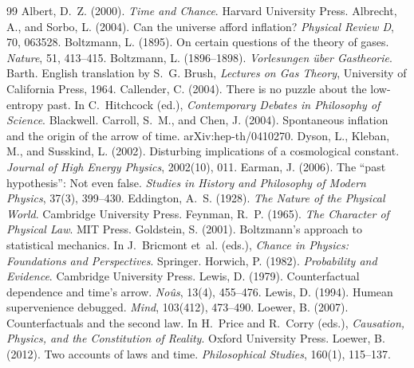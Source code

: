 \documentclass{situationist-preprint}
\begin{document}
\begin{thebibliography}{99}\small
{} Albert, D.~Z. (2000). \emph{Time and Chance}. Harvard University Press.
 Albrecht, A., and Sorbo, L. (2004). Can the universe afford inflation? \emph{Physical Review D}, 70, 063528.
 Boltzmann, L. (1895). On certain questions of the theory of gases. \emph{Nature}, 51, 413--415.
 Boltzmann, L. (1896--1898). \emph{Vorlesungen über Gastheorie}. Barth. English translation by S.~G. Brush, \emph{Lectures on Gas Theory}, University of California Press, 1964.
 Callender, C. (2004). There is no puzzle about the low-entropy past. In C.~Hitchcock (ed.), \emph{Contemporary Debates in Philosophy of Science}. Blackwell.
 Carroll, S.~M., and Chen, J. (2004). Spontaneous inflation and the origin of the arrow of time. arXiv:hep-th/0410270.
 Dyson, L., Kleban, M., and Susskind, L. (2002). Disturbing implications of a cosmological constant. \emph{Journal of High Energy Physics}, 2002(10), 011.
 Earman, J. (2006). The \enquote{past hypothesis}: Not even false. \emph{Studies in History and Philosophy of Modern Physics}, 37(3), 399--430.
 Eddington, A.~S. (1928). \emph{The Nature of the Physical World}. Cambridge University Press.
 Feynman, R.~P. (1965). \emph{The Character of Physical Law}. MIT Press.
 Goldstein, S. (2001). Boltzmann's approach to statistical mechanics. In J.~Bricmont et~al. (eds.), \emph{Chance in Physics: Foundations and Perspectives}. Springer.
 Horwich, P. (1982). \emph{Probability and Evidence}. Cambridge University Press.
 Lewis, D. (1979). Counterfactual dependence and time's arrow. \emph{No\^us}, 13(4), 455--476.
 Lewis, D. (1994). Humean supervenience debugged. \emph{Mind}, 103(412), 473--490.
 Loewer, B. (2007). Counterfactuals and the second law. In H.~Price and R.~Corry (eds.), \emph{Causation, Physics, and the Constitution of Reality}. Oxford University Press.
 Loewer, B. (2012). Two accounts of laws and time. \emph{Philosophical Studies}, 160(1), 115--137.

\end{thebibliography}
\end{document}
